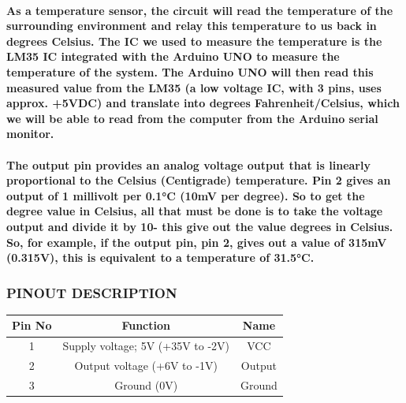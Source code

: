 \documentclass[12pt]{extarticle}
\numberwithin{figure}{section}
\begin{document}
\paragraph{As a temperature sensor, the circuit will read the temperature of the surrounding environment and relay this temperature to us back in degrees Celsius. The IC we used to measure the temperature is the LM35 IC integrated with the Arduino UNO to measure the temperature of the system. The Arduino UNO will then read this measured value from the LM35 (a low voltage IC, with 3 pins, uses approx. +5VDC) and translate into degrees Fahrenheit/Celsius, which we will be able to read from the computer from the Arduino serial monitor. 
}
\paragraph{The output pin provides an analog voltage output that is linearly proportional to the Celsius (Centigrade) temperature. Pin 2 gives an output of 1 millivolt per 0.1°C (10mV per degree). So to get the degree value in Celsius, all that must be done is to take the voltage output and divide it by 10- this give out the value degrees in Celsius. So, for example, if the output pin, pin 2, gives out a value of 315mV (0.315V), this is equivalent to a temperature of 31.5°C. 
}
\subsubsection{PINOUT DESCRIPTION}
\begin{center}
\begin{tabular}{ |c|c|c| }
\hline
\textbf{Pin No} & \textbf{Function} & \textbf{Name}\\
\hline
1 & Supply voltage; 5V (+35V to -2V) & VCC\\
\hline
2 & Output voltage (+6V to -1V) & Output\\
\hline
3 & Ground (0V) & Ground\\
\hline 
\end{tabular}
\end{center}
\end{document}
